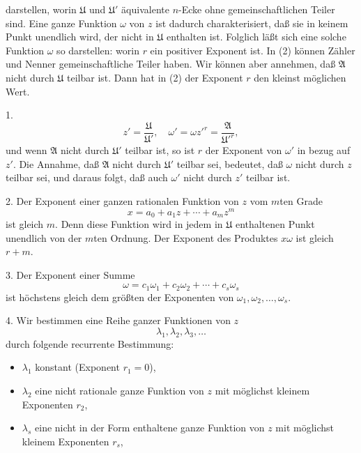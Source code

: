 darstellen, worin $\mathfrak{U}$ und $\mathfrak{U}'$ äquivalente $n$-Ecke ohne gemeinschaftlichen Teiler sind. Eine ganze Funktion $\omega$ von $z$ ist dadurch charakterisiert, daß sie in keinem Punkt unendlich wird, der nicht in $\mathfrak{U}$ enthalten ist. Folglich läßt sich eine solche Funktion $\omega$ so darstellen:
worin $r$ ein positiver Exponent ist. In (2) können Zähler und Nenner gemeinschaftliche Teiler haben. Wir können aber annehmen, daß $\mathfrak{A}$ nicht durch $\mathfrak{U}$ teilbar ist. Dann hat in (2) der Exponent $r$ den kleinst möglichen Wert. 

1. 
\[
z' = \frac{\mathfrak{U}}{\mathfrak{U}'}, \quad \omega' = \omega z'^r = \frac{\mathfrak{A}}{\mathfrak{U}'^r},
\]
und wenn $\mathfrak{A}$ nicht durch $\mathfrak{U}'$ teilbar ist, so ist $r$ der Exponent von $\omega'$ in bezug auf $z'$. Die Annahme, daß $\mathfrak{A}$ nicht durch $\mathfrak{U}'$ teilbar sei, bedeutet, daß $\omega$ nicht durch $z$ teilbar sei, und daraus folgt, daß auch $\omega'$ nicht durch $z'$ teilbar ist.

2. Der Exponent einer ganzen rationalen Funktion von $z$ vom $m$ten Grade
\[
x = a_0 + a_1 z + \cdots + a_m z^m
\]
ist gleich $m$. Denn diese Funktion wird in jedem in $\mathfrak{U}$ enthaltenen Punkt unendlich von der $m$ten Ordnung. Der Exponent des Produktes $x\omega$ ist gleich $r + m$.

3. Der Exponent einer Summe
\[
\omega = c_1\omega_1 + c_2\omega_2 + \cdots + c_s\omega_s
\]
ist höchstens gleich dem größten der Exponenten von $\omega_1, \omega_2, \ldots, \omega_s$.

4. Wir bestimmen eine Reihe ganzer Funktionen von $z$
\[
\lambda_1, \lambda_2, \lambda_3, \ldots
\]
durch folgende recurrente Bestimmung:
\begin{itemize}
\item[1)] $\lambda_1$ konstant (Exponent $r_1 = 0$),
\item[2)] $\lambda_2$ eine nicht rationale ganze Funktion von $z$ mit möglichst kleinem Exponenten $r_2$,
\item[3)] $\lambda_s$ eine nicht in der Form
enthaltene ganze Funktion von $z$ mit möglichst kleinem Exponenten $r_s$,
\end{itemize}
